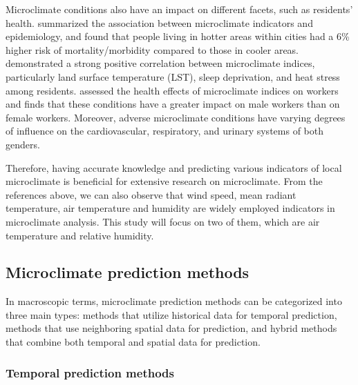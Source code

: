 \documentclass[a4paper,fleqn]{cas-sc}
\begin{document}
Microclimate conditions also have an impact on different facets, such as residents' health. \cite{schinasi2018modification} summarized the association between microclimate indicators and epidemiology, and found that people living in hotter areas within cities had a 6\% higher risk of mortality/morbidity compared to those in cooler areas. \cite{zeren2023geographic} demonstrated a strong positive correlation between microclimate indices, particularly land surface temperature (LST), sleep deprivation, and heat stress among residents. \cite{alimukhamedov2022hygienic} assessed the health effects of microclimate indices on workers and finds that these conditions have a greater impact on male workers than on female workers. Moreover, adverse microclimate conditions have varying degrees of influence on the cardiovascular, respiratory, and urinary systems of both genders.


Therefore, having accurate knowledge and predicting various indicators of local microclimate is beneficial for extensive research on microclimate. From the references above, we can also observe that wind speed, mean radiant temperature, air temperature and humidity are widely employed indicators in microclimate analysis. This study will focus on two of them, which are air temperature and relative humidity. 

\subsection{Microclimate prediction methods}

In macroscopic terms, microclimate prediction methods can be categorized into three main types: methods that utilize historical data for temporal prediction, methods that use neighboring spatial data for prediction, and hybrid methods that combine both temporal and spatial data for prediction.

\subsubsection{Temporal prediction methods}
\end{document}
